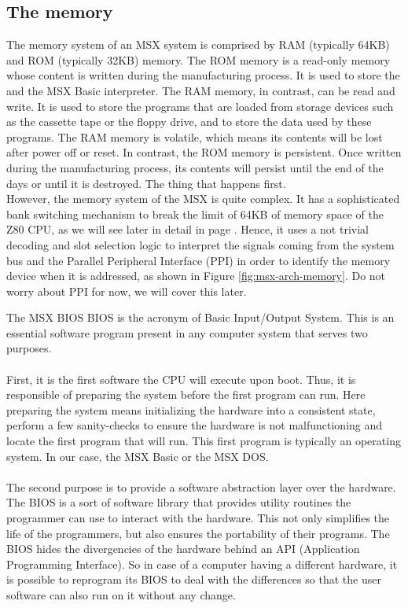 \subsection{The memory}

The memory system of an MSX system is comprised by RAM (typically 64KB) and ROM (typically 32KB) memory. The ROM memory is a read-only memory whose content is written during the manufacturing process. It is used to store the  and the MSX Basic interpreter. The RAM memory, in contrast, can be read and write. It is used to store the programs that are loaded from storage devices such as the cassette tape or the floppy drive, and to store the data used by these programs. The RAM memory is volatile, which means its contents will be lost after power off or reset. In contrast, the ROM memory is persistent. Once written during the manufacturing process, its contents will persist until the end of the days or until it is destroyed. The thing that happens first.\\

However, the memory system of the MSX is quite complex. It has a sophisticated bank switching mechanism to break the limit of 64KB of memory space of the Z80 CPU, as we will see later in detail in page \pageref{sec:msx-mem-slots}. Hence, it uses a not trivial decoding and slot selection logic to interpret the signals coming from the system bus and the Parallel Peripheral Interface (PPI) in order to identify the memory device when it is addressed, as shown in Figure \ref{fig:msx-arch-memory}. Do not worry about PPI for now, we will cover this later. \\

\begin{theory}{The MSX BIOS}
	BIOS is the acronym of Basic Input/Output System. This is an essential software program present in any computer system that serves two purposes.\\\\
	
	First, it is the first software the CPU will execute upon boot. Thus, it is responsible of preparing the system before the first program can run. Here preparing the system means initializing the hardware into a consistent state, perform a few sanity-checks to ensure the hardware is not malfunctioning and locate the first program that will run. This first program is typically an operating system. In our case, the MSX Basic or the MSX DOS.\\\\
	
	The second purpose is to provide a software abstraction layer over the hardware. The BIOS is a sort of software library that provides utility routines the programmer can use to interact with the hardware. This not only simplifies the life of the programmers, but also ensures the portability of their programs. The BIOS hides the divergencies of the hardware behind an API (Application Programming Interface). So in case of a computer having a different hardware, it is possible to reprogram its BIOS to deal with the differences so that the user software can also run on it without any change. 	
\end{theory}

